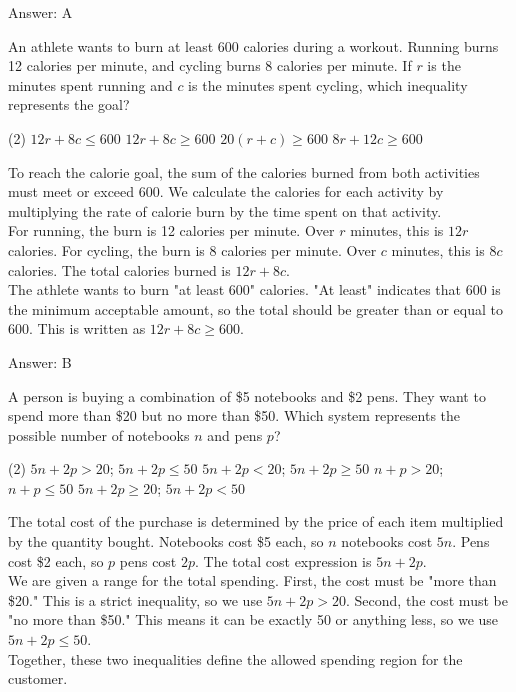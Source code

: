 \documentclass[11pt,paper=a4,answers]{exam}
\begin{document}
\begin{questions}
\begin{solution}
\vspace{15pt}
Answer: \colorbox{yellow!100}{A}
\end{solution}

\question
An athlete wants to burn at least 600 calories during a workout. Running burns 12 calories per minute, and cycling burns 8 calories per minute. If $r$ is the minutes spent running and $c$ is the minutes spent cycling, which inequality represents the goal?
\begin{tasks}(2)
    \task $12r + 8c \leq 600$
    \task $12r + 8c \geq 600$
    \task $20(r + c) \geq 600$
    \task $8r + 12c \geq 600$
\end{tasks}

\begin{solution}
To reach the calorie goal, the sum of the calories burned from both activities must meet or exceed 600. We calculate the calories for each activity by multiplying the rate of calorie burn by the time spent on that activity.
\\[10pt]
For running, the burn is 12 calories per minute. Over $r$ minutes, this is $12r$ calories. For cycling, the burn is 8 calories per minute. Over $c$ minutes, this is $8c$ calories. The total calories burned is $12r + 8c$.
\\[10pt]
The athlete wants to burn "at least 600" calories. "At least" indicates that 600 is the minimum acceptable amount, so the total should be greater than or equal to 600. This is written as $12r + 8c \geq 600$.

\vspace{15pt}
Answer: \colorbox{yellow!100}{B}
\end{solution}

\question
A person is buying a combination of \$5 notebooks and \$2 pens. They want to spend more than \$20 but no more than \$50. Which system represents the possible number of notebooks $n$ and pens $p$?
\begin{tasks}(2)
    \task $5n + 2p > 20$; $5n + 2p \leq 50$
    \task $5n + 2p < 20$; $5n + 2p \geq 50$
    \task $n + p > 20$; $n + p \leq 50$
    \task $5n + 2p \geq 20$; $5n + 2p < 50$
\end{tasks}

\begin{solution}
The total cost of the purchase is determined by the price of each item multiplied by the quantity bought. Notebooks cost \$5 each, so $n$ notebooks cost $5n$. Pens cost \$2 each, so $p$ pens cost $2p$. The total cost expression is $5n + 2p$.
\\[10pt]
We are given a range for the total spending. First, the cost must be "more than \$20." This is a strict inequality, so we use $5n + 2p > 20$. Second, the cost must be "no more than \$50." This means it can be exactly 50 or anything less, so we use $5n + 2p \leq 50$.
\\[10pt]
Together, these two inequalities define the allowed spending region for the customer.


\end{solution}
\end{questions}
\end{document}
